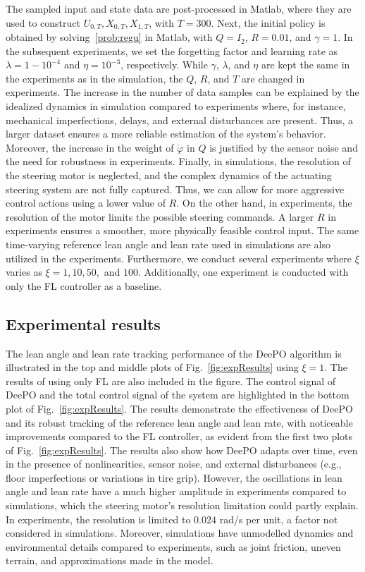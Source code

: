 The sampled input and state data are post-processed in Matlab, where they are used to construct $U_{0,T}, X_{0,T}, X_{1,T}$, with $T=300$. Next, the initial policy is obtained by solving~\eqref{prob:regu} in Matlab, with $Q=I_2$, $R=0.01$, and $\gamma=1$. In the subsequent experiments, we set the forgetting factor and learning rate as $\lambda = 1-10^{-4}$ and $\eta=10^{-3}$, respectively. While $\gamma$, $\lambda$, and $\eta$ are kept the same in the experiments as in the simulation, the $Q$, $R$, and $T$ are changed in experiments. The increase in the number of data samples can be explained by the idealized dynamics in simulation compared to experiments where, for instance, mechanical imperfections, delays, and external disturbances are present. Thus, a larger dataset ensures a more reliable estimation of the system's behavior. Moreover, the increase in the weight of $\dot\varphi$ in $Q$ is justified by the sensor noise and the need for robustness in experiments. Finally, in simulations, the resolution of the  steering motor is neglected, and the complex dynamics of the actuating steering system are not fully captured. Thus, we can allow for more aggressive control actions using a lower value of $R$. On the other hand, in experiments, the resolution of the motor limits the possible steering commands. A larger $R$ in experiments ensures a smoother, more physically feasible control input. The same time-varying reference lean angle and lean rate used in simulations are also utilized in the experiments. Furthermore, we conduct several experiments where $\xi$ varies as $\xi=1, 10, 50,$ and $100$. Additionally, one experiment is conducted with only the FL controller as a baseline.


\subsection{Experimental results}
The lean angle and lean rate tracking performance of the DeePO algorithm is illustrated in the top and middle plots of Fig.~\ref{fig:expResults} using $\xi = 1$. The results of using only FL are also included in the figure. The control signal of DeePO and the total control signal of the system are highlighted in the bottom plot of Fig.~\ref{fig:expResults}. The results demonstrate the effectiveness of DeePO and its robust tracking of the reference lean angle and lean rate, with noticeable improvements compared to the FL controller, as evident from the first two plots of Fig.~\ref{fig:expResults}. The results also show how DeePO adapts over time, even in the presence of nonlinearities, sensor noise, and external disturbances (e.g., floor imperfections or variations in tire grip). However, the oscillations in lean angle and lean rate have a much higher amplitude in experiments compared to simulations, which the steering motor's resolution limitation could partly explain. In experiments, the resolution is limited to $0.024$ rad/s per unit, a factor not considered in simulations. Moreover, simulations have unmodelled dynamics and environmental details compared to experiments, such as joint friction, uneven terrain, and approximations made in the model. 

